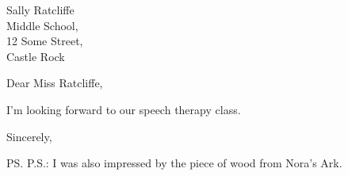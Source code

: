 \documentclass{letter}
\date{Summer, 1991}
\begin{document}
\begin{letter}{Sally Ratcliffe\\
		Middle School,\\
		12 Some Street,\\
	Castle Rock}
	\opening{Dear Miss Ratcliffe,}

	I'm looking forward to our speech therapy class.

	\closing{Sincerely,}

	\ps{P.S.: I was also impressed by the piece of wood from Nora's Ark.}
\end{letter}
\end{document}
